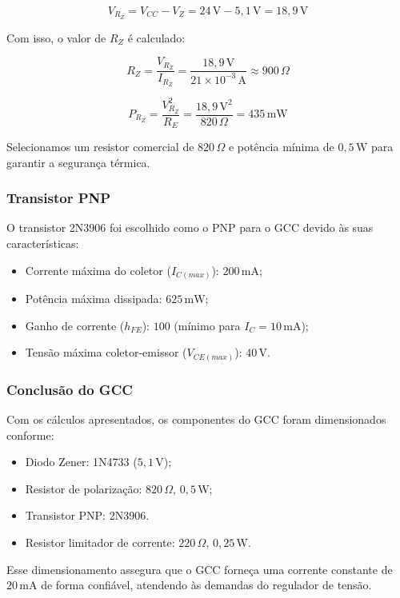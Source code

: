 \[
V_{R_Z} = V_{CC} - V_Z = 24 \, \text{V} - 5,1 \, \text{V} = 18,9 \, \text{V}
\]

Com isso, o valor de \(R_Z\) é calculado:  

\[
R_Z = \frac{V_{R_Z}}{I_{R_Z}} = \frac{18,9 \, \text{V}}{21 \times 10^{-3} \, \text{A}} \approx 900 \, \Omega
\]

\[
P_{R_Z} = \frac{V_{R_Z}^2}{R_E} = \frac{18,9 \, \text{V}^2}{820 \, \Omega} = 435 \, \text{mW}
\]

Selecionamos um resistor comercial de \(820 \, \Omega\) e potência mínima de \(0,5 \, \text{W}\) para garantir a segurança térmica.

\subsubsection*{Transistor PNP}  

O transistor 2N3906 foi escolhido como o PNP para o GCC devido às suas características:  

\begin{itemize}
    \item Corrente máxima do coletor (\(I_{C(max)}\)): \(200 \, \text{mA}\);
    \item Potência máxima dissipada: \(625 \, \text{mW}\);
    \item Ganho de corrente (\(h_{FE}\)): \(100\) (mínimo para \(I_C = 10 \, \text{mA}\));
    \item Tensão máxima coletor-emissor (\(V_{CE(max)}\)): \(40 \, \text{V}\).
\end{itemize}  

\subsubsection*{Conclusão do GCC}  

Com os cálculos apresentados, os componentes do GCC foram dimensionados conforme:  
\begin{itemize}
    \item Diodo Zener: 1N4733 (\(5,1 \, \text{V}\));
    \item Resistor de polarização: \(820 \, \Omega, \, 0,5 \, \text{W}\);
    \item Transistor PNP: 2N3906.
    \item Resistor limitador de corrente: \(220 \, \Omega, \, 0,25 \, \text{W}\).
\end{itemize}

Esse dimensionamento assegura que o GCC forneça uma corrente constante de \(20 \, \text{mA}\) de forma confiável, atendendo às demandas do regulador de tensão.  

